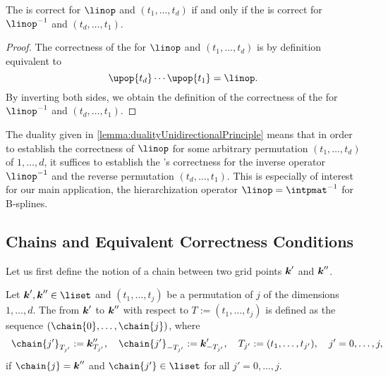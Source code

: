 \begin{lemma}
  \label{lemma:dualityUnidirectionalPrinciple}
  The \up is correct for $\linop$ and $(t_1, \dotsc, t_d)$
  if and only if the \up is correct for $\linopinv$ and $(t_d, \dotsc, t_1)$.
\end{lemma}

\begin{proof}
  The correctness of the \up for $\linop$ and $(t_1, \dotsc, t_d)$
  is by definition equivalent to
  \begin{equation}
    \upop{t_d} \dotsm \upop{t_1} = \linop.
  \end{equation}
  By inverting both sides, we obtain the definition of the
  correctness of the \up for $\linopinv$ and $(t_d, \dotsc, t_1)$.
\end{proof}

The duality given in \cref{lemma:dualityUnidirectionalPrinciple}
means that in order to establish the correctness of $\linop$
for some arbitrary permutation $(t_1, \dotsc, t_d)$ of $1, \dotsc, d$,
it suffices to establish the \up's correctness for the
inverse operator $\linopinv$ and the reverse permutation $(t_d, \dotsc, t_1)$.
This is especially of interest for our main application,
the hierarchization operator $\linop = \intpmatinv$ for B-splines.



\subsection{Chains and Equivalent Correctness Conditions}
\label{sec:453chains}

Let us first define the notion of a chain between two grid points
${\boldsymbol{k}}'$ and ${\boldsymbol{k}}''$.

\begin{definition}[chain]
  \label{def:chain}
  Let $\*k', \*k'' \in \liset$ and
  $(t_1, \dotsc, t_j)$ be a permutation of $j$ of the
  dimensions $1, \dotsc, d$.
  The  from ${\boldsymbol{k}}'$ to ${\boldsymbol{k}}''$ with respect to
  $T := (t_1, \dotsc, t_j)$ is defined as the sequence
  $(\chain{0}, \dotsc, \chain{j})$, where
  \begin{equation}
    \chain{j'}_{T_{j'}}
    := \*k''_{T_{j'}},\quad
    \chain{j'}_{-T_{j'}}
    := \*k'_{-T_{j'}},\quad
    T_{j'}
    := (t_1, \dotsc, t_{j'}),\quad
    j' = 0, \dotsc, j,
    \hspace*{-10mm}
  \end{equation}
  if $\chain{j} = \*k''$ and
  $\chain{j'} \in \liset$ for all $j' = 0, \dotsc, j$.
\end{definition}

